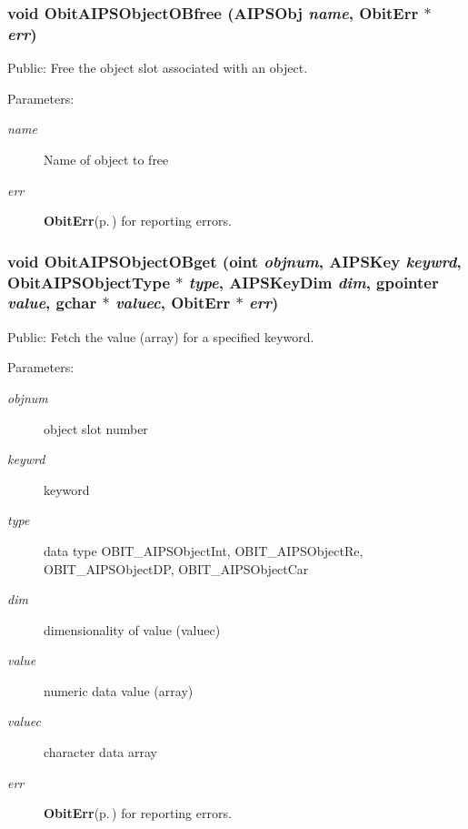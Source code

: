 \subsubsection{\setlength{\rightskip}{0pt plus 5cm}void Obit\-AIPSObject\-OBfree ({\bf AIPSObj} {\em name}, {\bf Obit\-Err} $\ast$ {\em err})}\label{ObitAIPSObject_8h_a15}


Public: Free the object slot associated with an object. 

\begin{Desc}
\item[Parameters:]
\begin{description}
\item[{\em name}]Name of object to free \item[{\em err}]{\bf Obit\-Err}{\rm (p.\,\pageref{structObitErr})} for reporting errors. \end{description}
\end{Desc}
\subsubsection{\setlength{\rightskip}{0pt plus 5cm}void Obit\-AIPSObject\-OBget ({\bf oint} {\em objnum}, {\bf AIPSKey} {\em keywrd}, Obit\-AIPSObject\-Type $\ast$ {\em type}, {\bf AIPSKey\-Dim} {\em dim}, gpointer {\em value}, gchar $\ast$ {\em valuec}, {\bf Obit\-Err} $\ast$ {\em err})}\label{ObitAIPSObject_8h_a19}


Public: Fetch the value (array) for a specified keyword. 

\begin{Desc}
\item[Parameters:]
\begin{description}
\item[{\em objnum}]object slot number \item[{\em keywrd}]keyword \item[{\em type}]data type OBIT\_\-AIPSObject\-Int, OBIT\_\-AIPSObject\-Re, OBIT\_\-AIPSObject\-DP, OBIT\_\-AIPSObject\-Car \item[{\em dim}]dimensionality of value (valuec) \item[{\em value}]numeric data value (array) \item[{\em valuec}]character data array \item[{\em err}]{\bf Obit\-Err}{\rm (p.\,\pageref{structObitErr})} for reporting errors. \end{description}
\end{Desc}
